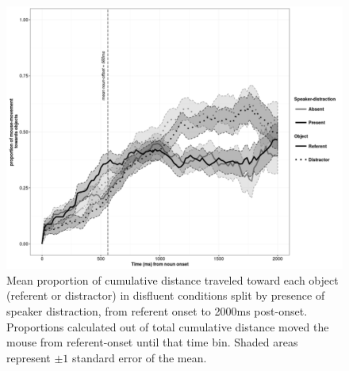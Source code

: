 \documentclass[man]{apa6}
\begin{document}
\begin{figure}
  \centering
	\includegraphics[scale=.5]{mdisfl.png}
  \caption{Mean proportion of cumulative distance traveled toward each object (referent or distractor) in disfluent conditions split by presence of speaker distraction, from referent onset to 2000ms post-onset. Proportions calculated out of total cumulative distance moved the mouse from referent-onset until that time bin. Shaded areas represent $\pm 1$ standard error of the mean.}
  \label{fig:mdis}
\end{figure}
\end{document}
